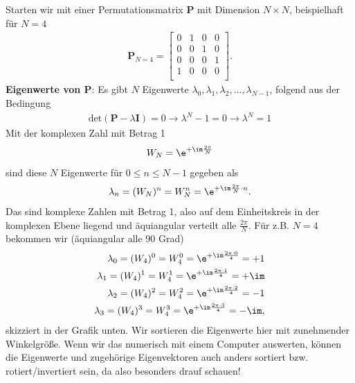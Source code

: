 Starten wir mit einer Permutationsmatrix $\bm{P}$ mit Dimension $N \times N$,
beispielhaft für $N=4$
\begin{align}
\bm{P}_{N=4} =
\begin{bmatrix}
0 & 1 & 0 & 0\\
0 & 0 & 1 & 0\\
0 & 0 & 0 & 1\\
1 & 0 & 0 & 0\\
\end{bmatrix}.
\end{align}
%
\textbf{Eigenwerte von $\bm{P}$}:
Es gibt $N$ Eigenwerte $\lambda_{0}, \lambda_{1}, \lambda_{2}, \dots, \lambda_{N-1}$,
folgend aus der Bedingung
\begin{align}
\mathrm{det}(\bm{P}-\lambda \bm{I}) = 0 \rightarrow \lambda^N - 1 = 0 \rightarrow \lambda^N = 1
\end{align}
%
Mit der komplexen Zahl mit Betrag 1
\begin{align}
W_N = \e^{+\im\frac{2\pi}{N}}
\end{align}
sind diese $N$ Eigenwerte für $0\leq n \leq N-1$ gegeben als
\begin{align}
\lambda_n =(W_N)^n = W_N^n = \e^{+\im\frac{2\pi}{N}\cdot n}.
\end{align}
Das sind komplexe Zahlen mit Betrag 1, also auf dem Einheitskreis in der komplexen
Ebene liegend und äquiangular verteilt alle $\frac{2\pi}{N}$.
%
Für z.B. $N=4$ bekommen wir (äquiangular alle 90 Grad)
\begin{align}
\lambda_0 =(W_4)^0 = W_4^0 = \e^{+\im\frac{2\pi\cdot 0}{4}} = +1\nonumber\\
\lambda_1 =(W_4)^1 = W_4^1 = \e^{+\im\frac{2\pi\cdot 1}{4}} = +\im\nonumber\\
\lambda_2 =(W_4)^2 = W_4^2 = \e^{+\im\frac{2\pi\cdot 2}{4}} = -1\nonumber\\
\lambda_3 =(W_4)^3 = W_4^3 = \e^{+\im\frac{2\pi\cdot 3}{4}} = -\im,
\end{align}
skizziert in der Grafik unten. Wir sortieren die Eigenwerte hier mit
zunehmender Winkelgröße. Wenn wir das numerisch mit einem Computer auswerten,
können die Eigenwerte und zugehörige Eigenvektoren auch anders sortiert bzw.
rotiert/invertiert sein,
da also besonders drauf schauen!
\begin{center}
\end{center}



